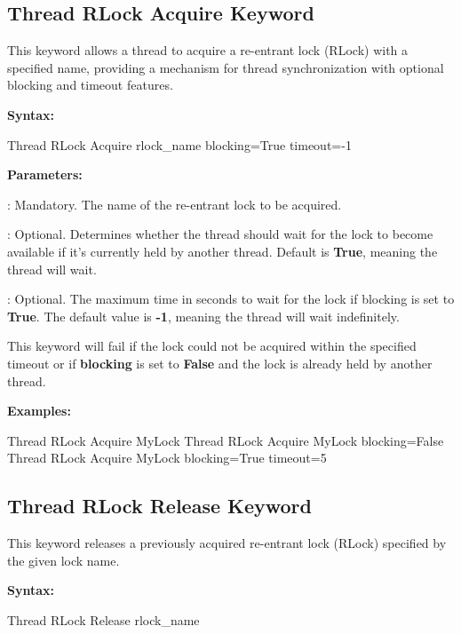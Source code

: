\subsection{Thread RLock Acquire Keyword}

This keyword allows a thread to acquire a re-entrant lock (RLock) with a specified name, providing a mechanism for thread synchronization with optional blocking and timeout features.

\textbf{Syntax:}

\begin{robotcode}
Thread RLock Acquire    rlock_name    blocking=True    timeout=-1
\end{robotcode}

\textbf{Parameters:}

: Mandatory. The name of the re-entrant lock to be acquired.

: Optional. Determines whether the thread should wait for the lock to become available if it's currently held by another thread. Default is \textbf{True}, meaning the thread will wait.

: Optional. The maximum time in seconds to wait for the lock if blocking is set to \textbf{True}. The default value is \textbf{-1}, meaning the thread will wait indefinitely.

This keyword will fail if the lock could not be acquired within the specified timeout or if \textbf{blocking} is set to \textbf{False} and the lock is already held by another thread.

\textbf{Examples:}

\begin{robotcode}
Thread RLock Acquire    MyLock
Thread RLock Acquire    MyLock    blocking=False
Thread RLock Acquire    MyLock    blocking=True    timeout=5
\end{robotcode}

\subsection{Thread RLock Release Keyword}

This keyword releases a previously acquired re-entrant lock (RLock) specified by the given lock name.

\textbf{Syntax:}

\begin{robotcode}
Thread RLock Release    rlock_name
\end{robotcode}

